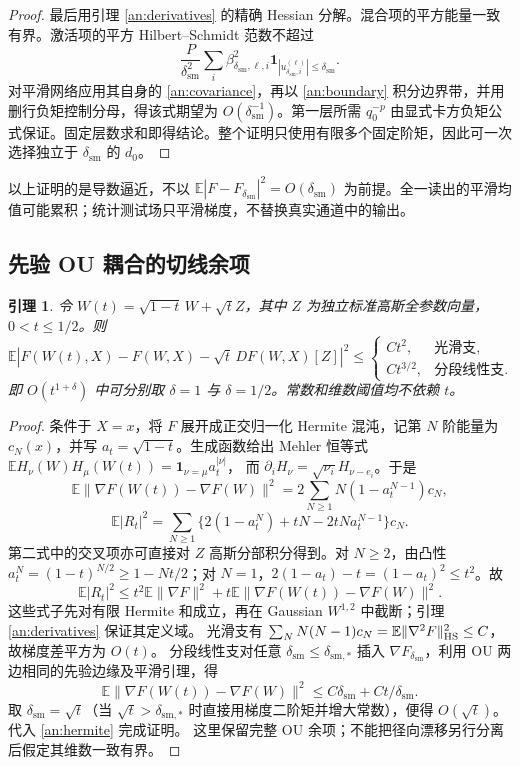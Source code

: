 \documentclass[a4paper]{tufte-handout}
\newtheorem{lemma}{引理}
\newcommand{\dsm}{\delta_{\mathrm{sm}}}
\begin{document}
\begin{fullwidth}
\begin{proof}
最后用引理 \ref{an:derivatives} 的精确 Hessian 分解。混合项的平方能量一致有界。激活项的平方 Hilbert--Schmidt 范数不超过
\[
 \frac P{\dsm^2}\sum_i\beta_{\dsm,\ell,i}^2
                       \boldsymbol1_{|u_{\dsm,i}^{(\ell)}|\le\dsm}.
\]
对平滑网络应用其自身的 \eqref{an:covariance}，再以 \eqref{an:boundary} 积分边界带，并用删行负矩控制分母，得该式期望为 $O(\dsm^{-1})$。第一层所需 $q_0^{-p}$ 由显式卡方负矩公式保证。固定层数求和即得结论。整个证明只使用有限多个固定阶矩，因此可一次选择独立于 $\dsm$ 的 $d_0$。
\end{proof}
以上证明的是导数逼近，不以 $\mathbb E|F-F_{\dsm}|^2=O(\dsm)$ 为前提。全一读出的平滑均值可能累积；统计测试场只平滑梯度，不替换真实通道中的输出。

\subsection{先验 OU 耦合的切线余项}
\begin{lemma}\label{an:ou}
令 $W(t)=\sqrt{1-t}\,W+\sqrt tZ$，其中 $Z$ 为独立标准高斯全参数向量，$0<t\le1/2$。则
\[
 \mathbb E|F(W(t),X)-F(W,X)-\sqrt t\,DF(W,X)[Z]|^2
 \le\begin{cases}Ct^2,&\text{光滑支},\\Ct^{3/2},&\text{分段线性支}.
 \end{cases}
\]
即 $O(t^{1+\delta})$ 中可分别取 $\delta=1$ 与 $\delta=1/2$。常数和维数阈值均不依赖 $t$。
\end{lemma}
\begin{proof}
条件于 $X=x$，将 $F$ 展开成正交归一化 Hermite 混沌，记第 $N$ 阶能量为 $c_N(x)$，并写 $a_t=\sqrt{1-t}$。生成函数给出 Mehler 恒等式
$\mathbb E H_\nu(W)H_\mu(W(t))=\boldsymbol1_{\nu=\mu}a_t^{|\nu|}$，
而 $\partial_iH_\nu=\sqrt{\nu_i}H_{\nu-e_i}$。于是
\[
 \mathbb E\|\nabla F(W(t))-\nabla F(W)\|^2
   =2\sum_{N\ge1}N(1-a_t^{N-1})c_N,
\]
\[
 \mathbb E|R_t|^2
  =\sum_{N\ge1}\{2(1-a_t^N)+tN-2tNa_t^{N-1}\}c_N.
\]
第二式中的交叉项亦可直接对 $Z$ 高斯分部积分得到。对 $N\ge2$，由凸性
$a_t^N=(1-t)^{N/2}\ge1-Nt/2$；对 $N=1$，$2(1-a_t)-t=(1-a_t)^2\le t^2$。故
\[
 \mathbb E|R_t|^2\le t^2\mathbb E\|\nabla F\|^2
             +t\mathbb E\|\nabla F(W(t))-\nabla F(W)\|^2. \tag{A12}\label{an:hermite}
\]
这些式子先对有限 Hermite 和成立，再在 Gaussian $W^{1,2}$ 中截断；引理 \ref{an:derivatives} 保证其定义域。
光滑支有 $\sum_NN(N-1)c_N=\mathbb E\|\nabla^2F\|_{\rm HS}^2\le C$，故梯度差平方为 $O(t)$。
分段线性支对任意 $\dsm\le\delta_{\mathrm{sm},*}$ 插入 $\nabla F_{\dsm}$，利用 OU 两边相同的先验边缘及平滑引理，得
\[
 \mathbb E\|\nabla F(W(t))-\nabla F(W)\|^2
 \le C\dsm+Ct/\dsm.
\]
取 $\dsm=\sqrt t$（当 $\sqrt t>\delta_{\mathrm{sm},*}$ 时直接用梯度二阶矩并增大常数），便得 $O(\sqrt t)$。代入 \eqref{an:hermite} 完成证明。
这里保留完整 OU 余项；不能把径向漂移另行分离后假定其维数一致有界。
\end{proof}


\end{fullwidth}
\end{document}
